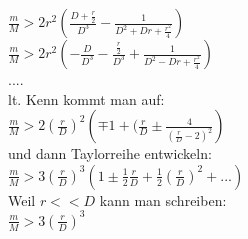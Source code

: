 $\frac{m}{M}>2 r^2 \left(\frac{D+\frac{r}{2}}{D^3}-\frac{1}{D^2+D r+\frac{r^2}{4}}\right)$ \\ 
$\frac{m}{M}>2 r^2 \left(-\frac{D}{D^3} -\frac{\frac{r}{2}}{D^3} +\frac{1}{D^2-D r+\frac{r^2}{4}}\right)$\\
....\\
lt. Kenn kommt man auf:\\
$\frac{m}{M}>2 \left(\frac{r}{D}\right)^2 \left(\mp 1 + (\frac{r}{D} \pm \frac{4}{\left(\frac{r}{D}-2\right)^2}\right)$ \\ 
und dann Taylorreihe entwickeln:\\
$\frac{m}{M}>3 \left(\frac{r}{D}\right)^3 \left( 1 \pm \frac{1}{2}\frac{r}{D} + \frac{1}{2}\left(\frac{r}{D}\right)^2 + ... \right)$ \\ 
Weil $r << D$ kann man schreiben:\\
$\frac{m}{M}>3 \left(\frac{r}{D}\right)^3$

